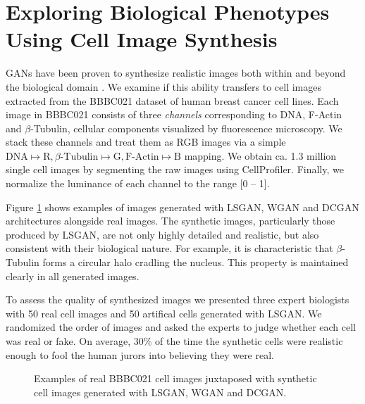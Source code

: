 \documentclass{article}
\begin{document}
\section{Exploring Biological Phenotypes Using Cell Image Synthesis}\label{synthesis}
GANs have been proven to synthesize realistic images both within and beyond the biological domain \cite{goodfellow2014generative,radford2015unsupervised,osokin2017gans}. We examine if this ability transfers to cell images extracted from the BBBC021 dataset of human breast cancer cell lines. Each image in BBBC021 consists of three \emph{channels} corresponding to DNA, F-Actin and $\beta$-Tubulin, cellular components visualized by fluorescence microscopy. We stack these channels and treat them as RGB images via a simple $\text{DNA} \mapsto \text{R}, \text{$\beta$-Tubulin} \mapsto \text{G}, \text{F-Actin} \mapsto \text{B}$ mapping. We obtain ca. 1.3 million single cell images by segmenting the raw images using CellProfiler. Finally, we normalize the luminance of each channel to the range [0 -- 1].


Figure \ref{fig:generated} shows examples of images generated with LSGAN, WGAN
and DCGAN architectures alongside real images. The synthetic images,
particularly those produced by LSGAN, are not only highly detailed and
realistic, but also consistent with their biological nature. For example, it is
characteristic that $\beta$-Tubulin forms a circular halo cradling the nucleus.
This property is maintained clearly in all generated images.

To assess the quality of synthesized images we presented three expert biologists
with 50 real cell images and 50 artifical cells generated with LSGAN. We
randomized the order of images and asked the experts to judge whether each cell
was real or fake. On average, 30\% of the time the synthetic cells were
realistic enough to fool the human jurors into believing they were real.

\begin{figure}[b]
  \centering
  \caption{Examples of real BBBC021 cell images juxtaposed with synthetic cell images generated with LSGAN, WGAN and DCGAN.}
  \label{fig:generated}
\end{figure}
\end{document}
